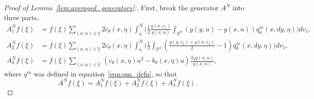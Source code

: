 \documentclass[EJP]{ejpecp} %
\newcommand{\IR}{\mathbb R}
\newcommand{\lp}{\xi}              %
\begin{document}
\begin{proof}[Proof of Lemma~\ref{lem:averaged_generators}:]
First, break the generator $A^N$ into three parts, 
\begin{align*}
    A^N_1f(\lp)
    &=
    f(\lp) \sum_{(x,u)\in\lp} 2 c_\theta(x,\eta)
    \int_u^{N}\Bigg(
        \frac{1}{2}\frac{g(x,v_1)}{g(x,u)}
        \int_{\IR^d} (g(y,u)-g(x,u))q^m_{\theta}(x,dy,\eta)
    \Bigg)dv_1 ,
    \\
    A^N_2f(\lp)
    &=
    f(\lp) \sum_{(x,u)\in\lp} 2 c_\theta(x,\eta)
    \int_u^{N}\Bigg(
        \frac{1}{2}\int_{\IR^d}
            \left(\frac{g(y,v_1) + g(x,v_1)}{2} - 1\right)
        q^m_{\theta}(x,dy,\eta)
    \Bigg)dv_1 ,
    \\
    A^N_3f(\lp)
    &=
    f(\lp) \sum_{(x,u)\in\lp}\,
    \left( c_\theta(x,\eta) u^2 - b_{\theta}(x,\eta)u \right) \frac{\partial_u g(x,u)}{g(x,u)},
\end{align*}
where $q^m$ was defined in equation~\eqref{eqn:qm_defn},
so that 
$$ A^Nf(\lp) = A^N_1f(\lp) + A^N_2f(\lp) + A^N_3f(\lp). $$


\end{proof}
\end{document}

